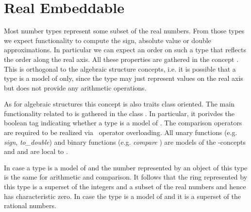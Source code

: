 \section{Real Embeddable}

Most number types represent some subset of the real numbers. From those types 
we expect functionality to compute the sign, absolute value or double 
approximations. In particular we can expect an order on such a type that 
reflects the order along the real axis. 
All these properties are gathered in the concept . 
This is orthogonal to the algebraic structure concepts, i.e. it is possible 
that a type is a model of  only, 
since the type may just represent values on the real axis
but does not provide any arithmetic operations.


As for algebraic structures this concept is also traits class oriented.
The main functionality related to  is gathered in 
the class . In particular, it porivdes the boolean 
tag   indicating whether a type is a model of 
. The comparison operators are required to be realized via 
\CC\ operator overloading. 
All unary functions (e.g. {\em sign}, {\em to\_double}) and 
binary functions (e.g. {\em compare} ) are models of the \stl-concepts 
 and  and are local 
to . 


In case a type is a model of  and  
 the number represented by an object of this type is 
the same for arithmetic and comparison.
It follows that the ring represented  by this type is a superset of the integers
and a subset of the real numbers and hence has characteristic zero.
In case the type is a model of  and  it is a 
superset of the rational numbers. 


